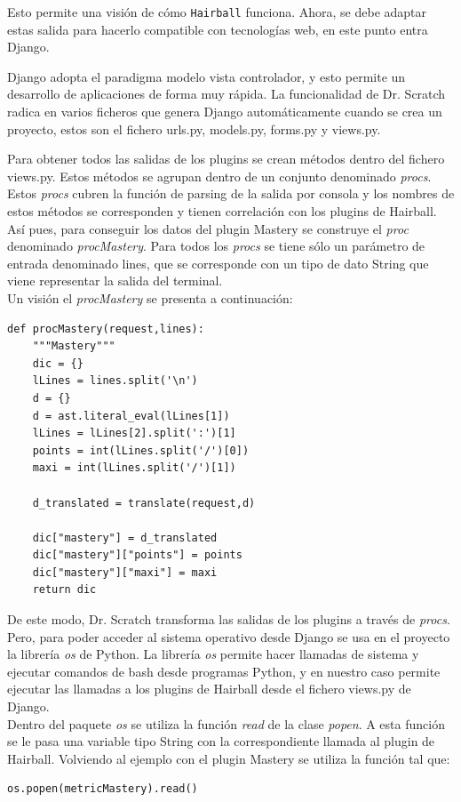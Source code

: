 \documentclass[a4paper, 12pt]{book}
\begin{document}
Esto permite una visión de cómo \texttt{Hairball} funciona. Ahora, se debe adaptar estas
salida para hacerlo compatible con tecnologías web, en este punto entra Django. 

Django adopta el paradigma modelo vista controlador, y esto permite un desarrollo de 
aplicaciones de forma muy rápida. La funcionalidad de Dr. Scratch radica en varios 
ficheros que genera Django automáticamente cuando se crea un proyecto, estos son el
fichero urls.py, models.py, forms.py y views.py.

Para obtener todos las salidas de los plugins se crean métodos dentro del fichero views.py.
Estos métodos se agrupan dentro de un conjunto denominado \emph{procs}. Estos \emph{procs}
cubren la función de parsing de la salida por consola y los nombres de estos métodos se
corresponden y tienen correlación con los plugins de Hairball. Así pues, para conseguir 
los datos del plugin Mastery se construye el \emph{proc} denominado \emph{procMastery}. 
Para todos los \emph{procs} se tiene sólo un parámetro de entrada denominado lines, que se
corresponde con un tipo de dato String que viene representar la salida del terminal. \\

Un visión el \emph{procMastery} se presenta a continuación:
\begingroup
\fontsize{7pt}{8pt}\selectfont
\begin{verbatim}
def procMastery(request,lines):
    """Mastery"""
    dic = {}
    lLines = lines.split('\n')
    d = {}
    d = ast.literal_eval(lLines[1])
    lLines = lLines[2].split(':')[1]
    points = int(lLines.split('/')[0])
    maxi = int(lLines.split('/')[1])
    
    d_translated = translate(request,d)

    dic["mastery"] = d_translated
    dic["mastery"]["points"] = points
    dic["mastery"]["maxi"] = maxi
    return dic
\end{verbatim}
\endgroup

De este modo, Dr. Scratch transforma las salidas de los plugins a través de \emph{procs}. 
Pero, para poder acceder al sistema operativo desde Django se usa en el proyecto la
librería \emph{os} de Python. La librería \emph{os} permite hacer llamadas de sistema y
ejecutar comandos de bash desde programas Python, y en nuestro caso permite ejecutar las
llamadas a los plugins de Hairball desde el fichero views.py de Django. \\

Dentro del paquete \emph{os} se utiliza la función \emph{read} de la clase \emph{popen}.
A esta función se le pasa una variable tipo String con la correspondiente llamada al 
plugin de Hairball. Volviendo al ejemplo con el plugin Mastery se utiliza la función 
tal que: \\
\begingroup
\fontsize{7pt}{8pt}\selectfont
\begin{verbatim}
os.popen(metricMastery).read()
\end{verbatim}
\endgroup
\end{document}
